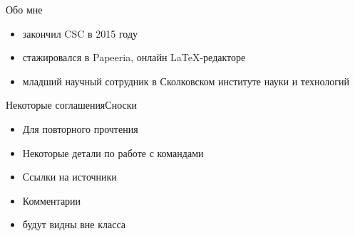 

\begin{frame}{Обо мне}\relax
     \begin{itemize}
         \item закончил CSC в 2015 году
         \item стажировался в Papeeria, онлайн \LaTeX -редакторе
         \item младший научный сотрудник в Сколковском институте науки и технологий
          
     \end{itemize}
\end{frame}

{\supressfootnotefalse
\begin{frame}{Некоторые соглашения}{Сноски}\relax
    
    \begin{itemize}
         \item Для повторного прочтения
         \item Некоторые детали по работе с командами
         \item Ссылки на источники
         \item Комментарии
         \item будут видны вне класса
    \end{itemize}
\end{frame}
}

